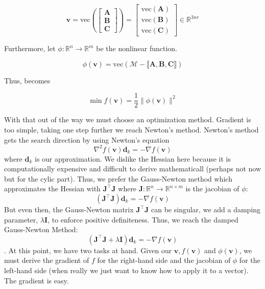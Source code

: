     \begin{equation*}
        \mathbf{v} = \text{vec}
        \left(
        \left[
            \begin{array}{c}
                \mathbf{A} \\
                \mathbf{B} \\
                \mathbf{C}
            \end{array}
        \right]
        \right) = 
        \left[
            \begin{array}{c}
                \text{vec}(\mathbf{A}) \\
                \text{vec}(\mathbf{B}) \\
                \text{vec}(\mathbf{C})
            \end{array}
        \right]
        \in \mathbb{R}^{3nr}
    \end{equation*}

    Furthermore, let $\phi: \mathbb{R}^n \to \mathbb{R}^m$ be the nonlinear
    function. 

    \begin{equation}
        \phi (\mathbf{v}) = \text{vec}(\mathcal{M} - \llbracket \mathbf{A, B, C} \rrbracket)
    \end{equation}

    Thus,  becomes 

    \begin{equation}
        \min f(\mathbf{v}) = \frac{1}{2} \|\phi (\mathbf{v})\|^2
    \end{equation}

    With that out of the way we must choose an optimization method. Gradient is
    too simple, taking one step further we reach Newton's method. Newton's
    method gets the search direction by using Newton's equation
    \[\nabla^2 f(\mathbf{v})\mathbf{d}_k = -\nabla f(\mathbf{v})\] where
    $\mathbf{d}_k$ is our approximation. We dislike the Hessian here because it
    is computationally expensive and difficult to derive mathematicall (perhaps
    not now but for the cylic part). Thus, we prefer the Gauss-Newton method
    which approximates the Hessian with $\mathbf{J^\intercal J}$ where
    $\mathbf{J}: \mathbb{R}^n\to \mathbb{R}^{n\times m}$ is the jacobian of
    $\phi$: \[(\mathbf{J^\intercal J})\mathbf{d}_k = -\nabla f(\mathbf{v})\] But
    even then, the Gauss-Newton matrix $\mathbf{J^\intercal J}$ can be singular,
    we add a damping parameter, $\lambda \mathbf{I}$, to enforce positive
    definiteness. Thus, we reach the damped Gauss-Newton Method:
    \[(\mathbf{J^\intercal J} + \lambda\mathbf{I})\mathbf{d}_k = -\nabla
    f(\mathbf{v})\]. At this point, we have two tasks at hand. Given our
    $\mathbf{v}, f(\mathbf{v})$ and $\phi(\mathbf{v})$, we must derive the
    gradient of $f$ for the right-hand side and the jacobian of $\phi$ for the
    left-hand side (when really we just want to know how to apply it to a
    vector). The gradient is easy. 

